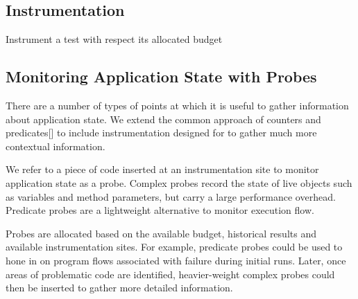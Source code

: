 \subsection{Instrumentation}


\begin{algorithm}[H]
\caption{Instrument a test with respect its allocated budget}
\label{alg:instrument}
\begin{algorithmic}
			\Else
			\EndIf
		\EndFor
	\EndWhile
\end{algorithmic}
\end{algorithm}


\subsection{Monitoring Application State with Probes}

There are a number of types of points at which it is useful to gather information about application state. We extend the common approach of counters and predicates[] to include instrumentation designed for to gather much more contextual information.

We refer to a piece of code inserted at an instrumentation site to monitor application state as a probe. Complex probes record the state of live objects such as variables and method parameters, but carry a large performance overhead. Predicate probes are a lightweight alternative to monitor execution flow.

Probes are allocated based on the available budget, historical results and available instrumentation sites. For example, predicate probes could be used to hone in on program flows associated with failure during initial runs. Later, once areas of problematic code are identified, heavier-weight complex probes could then be inserted to gather more detailed information.


